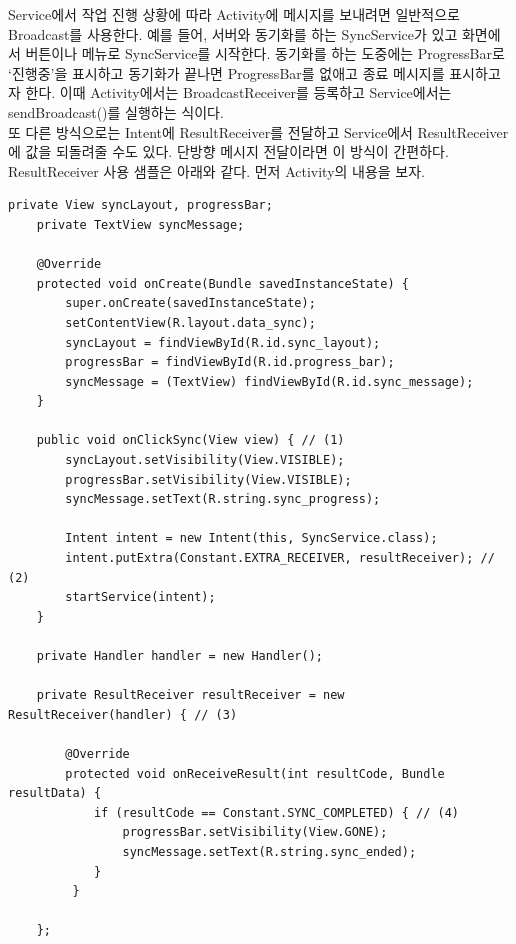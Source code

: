 Service에서 작업 진행 상황에 따라 Activity에 메시지를 보내려면 일반적으로 Broadcast를 사용한다.
예를 들어, 서버와 동기화를 하는 SyncService가 있고 화면에서 버튼이나 메뉴로 SyncService를 시작한다. 
동기화를 하는 도중에는 ProgressBar로 `진행중'을 표시하고 동기화가 끝나면 ProgressBar를 없애고 종료 메시지를 표시하고자 한다.
이때 Activity에서는 BroadcastReceiver를 등록하고 Service에서는 sendBroadcast()를 실행하는 식이다.\\

또 다른 방식으로는 Intent에 ResultReceiver를 전달하고 Service에서 ResultReceiver에 값을 되돌려줄 수도 있다. 단방향 메시지 전달이라면 이 방식이 간편하다.\\

ResultReceiver 사용 샘플은 아래와 같다. 먼저 Activity의 내용을 보자. 
\begin{lstlisting}[frame=single]
	private View syncLayout, progressBar;
	private TextView syncMessage;

	@Override
	protected void onCreate(Bundle savedInstanceState) {
   		super.onCreate(savedInstanceState);
   		setContentView(R.layout.data_sync);
   		syncLayout = findViewById(R.id.sync_layout);
   		progressBar = findViewById(R.id.progress_bar);
  	 	syncMessage = (TextView) findViewById(R.id.sync_message);
	}

	public void onClickSync(View view) { // (1)
   		syncLayout.setVisibility(View.VISIBLE);
   		progressBar.setVisibility(View.VISIBLE);
   		syncMessage.setText(R.string.sync_progress);

   		Intent intent = new Intent(this, SyncService.class);
   		intent.putExtra(Constant.EXTRA_RECEIVER, resultReceiver); // (2)
   		startService(intent);
	}

	private Handler handler = new Handler();

	private ResultReceiver resultReceiver = new ResultReceiver(handler) { // (3)

   		@Override
   		protected void onReceiveResult(int resultCode, Bundle resultData) {
      		if (resultCode == Constant.SYNC_COMPLETED) { // (4)
         		progressBar.setVisibility(View.GONE);
        		syncMessage.setText(R.string.sync_ended); 
      		}
  		 }

	};	
\end{lstlisting}
